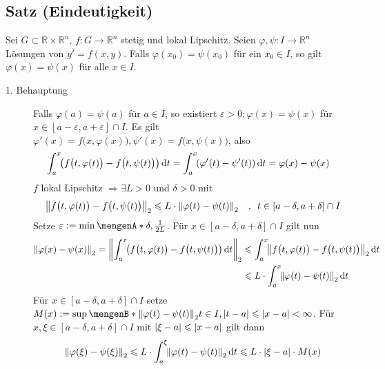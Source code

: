 \subsection[Satz: Eindeutigkeit von Lösungen, wenn $f$ lokal Lipschitz]{Satz (Eindeutigkeit)} %
\label{sub:16}
Sei $G \subset \mathds{R} \times \mathds{R}^n$, $f :G  \to \mathds{R}^n$ stetig und lokal Lipschitz. Seien $\varphi, \psi : I \to \mathds{R}^n$ Lösungen von $y'= f(x,y)$.
Falls $\varphi(x_0)= \psi(x_0)$ für ein $x_0 \in I$, so gilt $\varphi(x)= \psi(x)$ für alle $x \in I$.
\begin{description}
	\item[1. Behauptung] Falls $\varphi(a)= \psi(a)$ für $a \in I$, so existiert $\varepsilon >0 : \varphi(x)= \psi (x)$ für $x \in [a- \varepsilon, a+\varepsilon]\cap I$.
	Es gilt $\varphi'(x)= f\big(x, \varphi(x)\big), \psi'(x)= f\big(x,\psi(x)\big)$, also 
	\begin{align*}
		\int_{a} ^{x} \! \enbrace*{ f\big(t,\varphi(t)\big) - f\big(t,\psi(t)\big)}  \, \mathrm{d}t &= \int_{a} ^{x} \! \enbrace*{\varphi'(t) - \psi'(t)}  \, \mathrm{d}t = \varphi(x)-\psi(x) 
	\end{align*}
	$f$ lokal Lipschitz $\Rightarrow \exists L >0$ und $\delta >0$ mit 
	\begin{align*}
		\norm[2]{f\big(t, \varphi(t) \big) - f\big(t, \psi(t)\big)} \le L \cdot \norm[2]{ \varphi(t) - \psi(t) }  \quad, \enspace t \in [a- \delta , a+ \delta ]\cap I
	\end{align*} 
	Setze $\varepsilon := \min \set{\delta , \frac{1}{2 L} } $. Für $x \in  [a- \delta , a+ \delta ] \cap I$ gilt nun
	\begin{align*}
		\norm[2]{\varphi(x)- \psi(x)} = \norm[2]{\int_{a} ^{x} \! \enbrace*{f\big(t, \varphi(t)\big) - f\big(t, \psi(t)\big)}  \, \mathrm{d}t} &\le \int_{a} ^{x} \! 
		\norm[2]{f\big(t, \varphi(t)\big) - f\big(t, \psi(t)\big)}  \, \mathrm{d}t \\
		&\le L \cdot \int_{a} ^{x} \! \norm[2]{\varphi(t)- \psi(t)}  \, \mathrm{d}t 
	\end{align*}
	Für $x \in [a- \delta , a+ \delta ] \cap I$ setze $M(x) := \sup \set[{\norm[2]{\varphi(t)- \psi(t)}}]{t \in I, \abs*{t-a}\le \abs*{x-a}  } < \infty  $.
	Für $x, \xi \in [a-\delta , a+\delta ] \cap I$ mit $\abs*{\xi-a}\le \abs*{x-a}  $ gilt dann 
	\begin{align*}
		\norm[2]{\varphi(\xi) - \psi(\xi)} \le L \cdot \int_{a} ^{\xi} \!  \norm[2]{\varphi(t)- \psi(t)}  \, \mathrm{d}t \le L \cdot \abs*{\xi -a}\cdot M(x) 

\end{align*}
\end{description}
